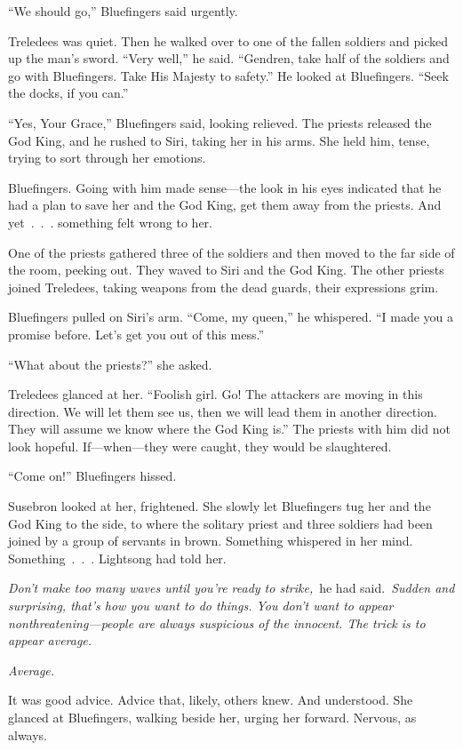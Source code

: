 “We should go,” Bluefingers said urgently.

Treledees was quiet. Then he walked over to one of the fallen soldiers and picked up the man’s sword. “Very well,” he said. “Gendren, take half of the soldiers and go with Bluefingers. Take His Majesty to safety.” He looked at Bluefingers. “Seek the docks, if you can.”

“Yes, Your Grace,” Bluefingers said, looking relieved. The priests released the God King, and he rushed to Siri, taking her in his arms. She held him, tense, trying to sort through her emotions.

Bluefingers. Going with him made sense—the look in his eyes indicated that he had a plan to save her and the God King, get them away from the priests. And yet~.~.~. something felt wrong to her.

One of the priests gathered three of the soldiers and then moved to the far side of the room, peeking out. They waved to Siri and the God King. The other priests joined Treledees, taking weapons from the dead guards, their expressions grim.

Bluefingers pulled on Siri’s arm. “Come, my queen,” he whispered. “I made you a promise before. Let’s get you out of this mess.”

“What about the priests?” she asked.

Treledees glanced at her. “Foolish girl. Go! The attackers are moving in this direction. We will let them see us, then we will lead them in another direction. They will assume we know where the God King is.” The priests with him did not look hopeful. If—when—they were caught, they would be slaughtered.

“Come on!” Bluefingers hissed.

Susebron looked at her, frightened. She slowly let Bluefingers tug her and the God King to the side, to where the solitary priest and three soldiers had been joined by a group of servants in brown. Something whispered in her mind. Something~.~.~. Lightsong had told her.

\textit{Don’t make too many waves until you’re ready to strike,}~he had said.~\textit{Sudden and surprising, that’s how you want to do things. You don’t want to appear nonthreatening—people are always suspicious of the innocent. The trick is to appear average.}

\textit{Average.}

It was good advice. Advice that, likely, others knew. And understood. She glanced at Bluefingers, walking beside her, urging her forward. Nervous, as always.

